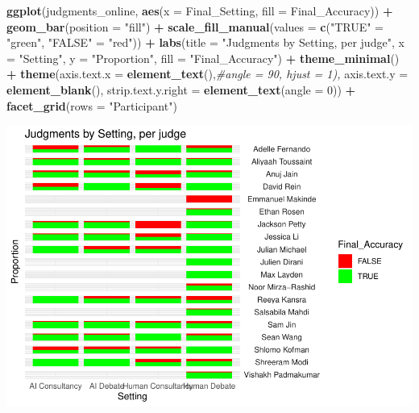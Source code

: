 \documentclass[
]{article}
\newenvironment{Shaded}{\begin{snugshade}}{\end{snugshade}}
\newcommand{\AttributeTok}[1]{\textcolor[rgb]{0.13,0.29,0.53}{#1}}
\newcommand{\CommentTok}[1]{\textcolor[rgb]{0.56,0.35,0.01}{\textit{#1}}}
\newcommand{\DecValTok}[1]{\textcolor[rgb]{0.00,0.00,0.81}{#1}}
\newcommand{\FunctionTok}[1]{\textcolor[rgb]{0.13,0.29,0.53}{\textbf{#1}}}
\newcommand{\NormalTok}[1]{#1}
\newcommand{\OtherTok}[1]{\textcolor[rgb]{0.56,0.35,0.01}{#1}}
\newcommand{\SpecialCharTok}[1]{\textcolor[rgb]{0.81,0.36,0.00}{\textbf{#1}}}
\newcommand{\StringTok}[1]{\textcolor[rgb]{0.31,0.60,0.02}{#1}}
\begin{document}
\begin{Shaded}
\begin{Highlighting}[]
\FunctionTok{ggplot}\NormalTok{(judgments\_online, }\FunctionTok{aes}\NormalTok{(}\AttributeTok{x =}\NormalTok{ Final\_Setting, }\AttributeTok{fill =}\NormalTok{ Final\_Accuracy)) }\SpecialCharTok{+}
  \FunctionTok{geom\_bar}\NormalTok{(}\AttributeTok{position =} \StringTok{"fill"}\NormalTok{) }\SpecialCharTok{+}
  \FunctionTok{scale\_fill\_manual}\NormalTok{(}\AttributeTok{values =} \FunctionTok{c}\NormalTok{(}\StringTok{"TRUE"} \OtherTok{=} \StringTok{"green"}\NormalTok{, }\StringTok{"FALSE"} \OtherTok{=} \StringTok{"red"}\NormalTok{)) }\SpecialCharTok{+}
  \FunctionTok{labs}\NormalTok{(}\AttributeTok{title =} \StringTok{"Judgments by Setting, per judge"}\NormalTok{, }\AttributeTok{x =} \StringTok{"Setting"}\NormalTok{, }\AttributeTok{y =} \StringTok{"Proportion"}\NormalTok{, }\AttributeTok{fill =} \StringTok{"Final\_Accuracy"}\NormalTok{) }\SpecialCharTok{+}
  \FunctionTok{theme\_minimal}\NormalTok{() }\SpecialCharTok{+}
  \FunctionTok{theme}\NormalTok{(}\AttributeTok{axis.text.x =} \FunctionTok{element\_text}\NormalTok{(),}\CommentTok{\#angle = 90, hjust = 1),}
        \AttributeTok{axis.text.y =} \FunctionTok{element\_blank}\NormalTok{(),}
        \AttributeTok{strip.text.y.right =} \FunctionTok{element\_text}\NormalTok{(}\AttributeTok{angle =} \DecValTok{0}\NormalTok{)) }\SpecialCharTok{+}
  \FunctionTok{facet\_grid}\NormalTok{(}\AttributeTok{rows =} \StringTok{"Participant"}\NormalTok{)}
\end{Highlighting}
\end{Shaded}

\includegraphics[width=1\linewidth]{debate-2309_files/figure-latex/quick ori stats cont-1}
\end{document}
